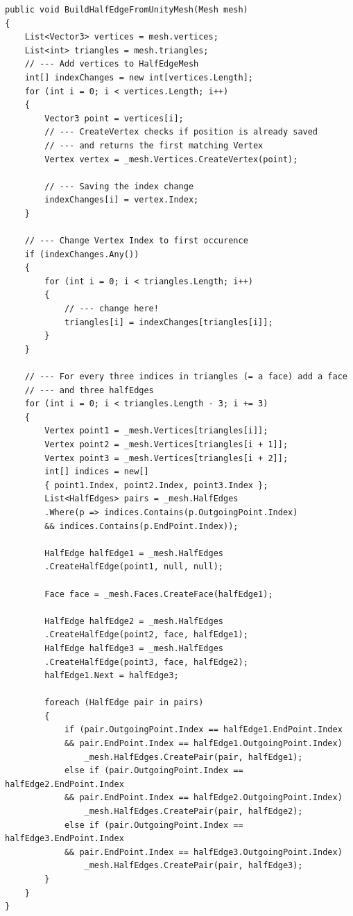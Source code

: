 \begin{lstlisting}
public void BuildHalfEdgeFromUnityMesh(Mesh mesh)
{
	List<Vector3> vertices = mesh.vertices;
	List<int> triangles = mesh.triangles;
	// --- Add vertices to HalfEdgeMesh
	int[] indexChanges = new int[vertices.Length];
	for (int i = 0; i < vertices.Length; i++)
	{
		Vector3 point = vertices[i];
		// --- CreateVertex checks if position is already saved 
		// --- and returns the first matching Vertex
		Vertex vertex = _mesh.Vertices.CreateVertex(point);
		
		// --- Saving the index change
		indexChanges[i] = vertex.Index;
	}
	
	// --- Change Vertex Index to first occurence
	if (indexChanges.Any())
	{
		for (int i = 0; i < triangles.Length; i++)
		{
			// --- change here!
			triangles[i] = indexChanges[triangles[i]];
		}
	}
	
	// --- For every three indices in triangles (= a face) add a face 
	// --- and three halfEdges
	for (int i = 0; i < triangles.Length - 3; i += 3)
	{
		Vertex point1 = _mesh.Vertices[triangles[i]];
		Vertex point2 = _mesh.Vertices[triangles[i + 1]];
		Vertex point3 = _mesh.Vertices[triangles[i + 2]];
		int[] indices = new[] 
		{ point1.Index, point2.Index, point3.Index };
		List<HalfEdges> pairs = _mesh.HalfEdges
		.Where(p => indices.Contains(p.OutgoingPoint.Index)
		&& indices.Contains(p.EndPoint.Index));
	
		HalfEdge halfEdge1 = _mesh.HalfEdges
		.CreateHalfEdge(point1, null, null);
	
		Face face = _mesh.Faces.CreateFace(halfEdge1);
	
		HalfEdge halfEdge2 = _mesh.HalfEdges
		.CreateHalfEdge(point2, face, halfEdge1);
		HalfEdge halfEdge3 = _mesh.HalfEdges
		.CreateHalfEdge(point3, face, halfEdge2);
		halfEdge1.Next = halfEdge3;
	
		foreach (HalfEdge pair in pairs)
		{
			if (pair.OutgoingPoint.Index == halfEdge1.EndPoint.Index 
			&& pair.EndPoint.Index == halfEdge1.OutgoingPoint.Index)
				_mesh.HalfEdges.CreatePair(pair, halfEdge1);
			else if (pair.OutgoingPoint.Index == halfEdge2.EndPoint.Index 
			&& pair.EndPoint.Index == halfEdge2.OutgoingPoint.Index)
				_mesh.HalfEdges.CreatePair(pair, halfEdge2);
			else if (pair.OutgoingPoint.Index == halfEdge3.EndPoint.Index 
			&& pair.EndPoint.Index == halfEdge3.OutgoingPoint.Index)
				_mesh.HalfEdges.CreatePair(pair, halfEdge3);
		}
	}
}
\end{lstlisting}
